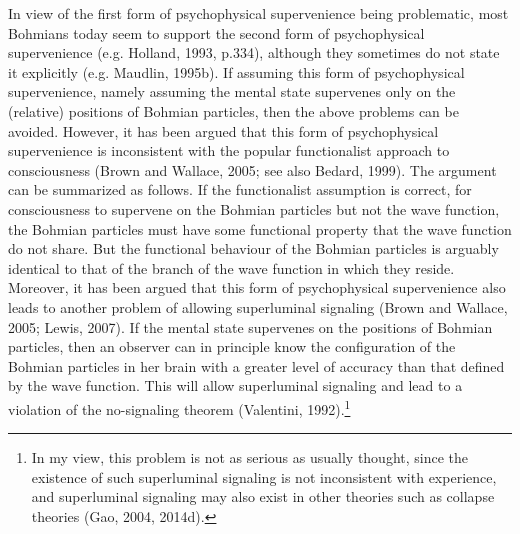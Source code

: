 In view of the first form of psychophysical supervenience being problematic, most Bohmians today seem to support the second form of psychophysical supervenience (e.g. Holland, 1993, p.334), although they sometimes do not state it explicitly (e.g. Maudlin, 1995b). 
If assuming this form of psychophysical supervenience, namely assuming the mental state supervenes only on the (relative) positions of Bohmian particles, then the above problems can be avoided.
However, it has been argued that this form of psychophysical supervenience is inconsistent with the popular functionalist approach to consciousness (Brown and Wallace, 2005; see also Bedard, 1999). The argument can be summarized as follows. If the functionalist assumption is correct, for consciousness to supervene on the Bohmian particles but not the wave function, the Bohmian particles must have some functional property that the wave function do not share. But the functional behaviour of the Bohmian particles is arguably identical to that of the branch of the wave function in which they reside. 
Moreover, it has been argued that this form of psychophysical supervenience also leads to another problem of allowing superluminal signaling (Brown and Wallace, 2005; Lewis, 2007). If the mental state supervenes on the positions of Bohmian particles, then an observer can in principle know the configuration of the Bohmian particles in her brain with a greater level of accuracy than that defined by the wave function. This will allow superluminal signaling and lead to a violation of the no-signaling theorem (Valentini, 1992).\footnote{In my view, this problem is not as serious as usually thought, since the existence of such superluminal signaling is not inconsistent with experience, and superluminal signaling may also exist in other theories such as collapse theories (Gao, 2004, 2014d).} %

